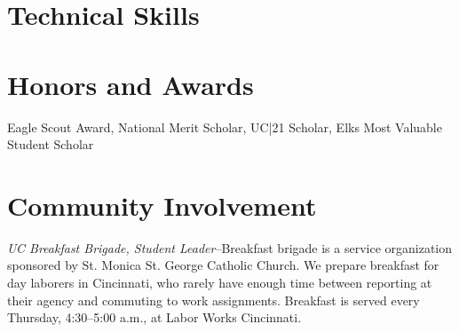 \documentclass[10pt,letterpaper,roman]{moderncv}	%
\begin{document}

\section{Technical Skills}

\section{Honors and Awards}
Eagle Scout Award, National Merit Scholar, UC|21 Scholar, Elks Most Valuable Student Scholar

\section{Community Involvement}
\emph{UC Breakfast Brigade, Student Leader}--Breakfast brigade is a service organization sponsored by St. Monica St. George Catholic Church. We prepare breakfast for day laborers in Cincinnati, who rarely have enough time between reporting at their agency and commuting to work assignments. Breakfast is served every Thursday, 4:30--5:00 a.m., at Labor Works Cincinnati.
\\
\\

\end{document}
